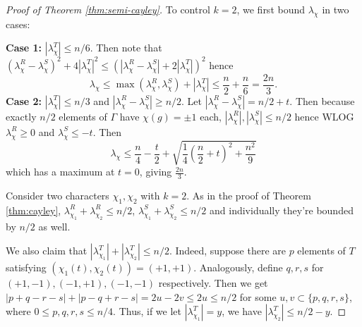 \documentclass[12pt]{article}
\begin{document}
\begin{proof}[Proof of Theorem \ref{thm:semi-cayley}]
    To control $k = 2$, we first bound $\lambda_\chi$ in two cases:
    \begin{outline}[enumerate]
        \1 \textbf{Case 1:} $|\lambda_\chi^T| \le n/6$. Then note that $(\lambda_\chi^R - \lambda_\chi^S)^2 + 4|\lambda_\chi^T|^2 \le (|\lambda_\chi^R - \lambda_\chi^S| + 2|\lambda_\chi^T|)^2$ hence
        \[\lambda_\chi \le \max(\lambda_\chi^R, \lambda_\chi^S) + |\lambda_\chi^T| \le \frac{n}{2} + \frac{n}{6} = \frac{2n}{3}.\] 
        \1 \textbf{Case 2:} $|\lambda_\chi^T| \le n/3$ and $|\lambda_\chi^R - \lambda_\chi^S| \ge n/2$. Let $|\lambda_\chi^R - \lambda_\chi^S| = n/2 + t$. Then because exactly $n/2$ elements of $\Gamma$ have $\chi(g) = \pm 1$ each, $|\lambda_\chi^R|, |\lambda_\chi^S| \le n/2$ hence WLOG $\lambda_\chi^R \ge 0$ and $\lambda_\chi^S \le -t$. Then 
        \[\lambda_\chi \le \frac{n}{4} - \frac{t}{2} + \sqrt{\frac14\left(\frac{n}{2} + t\right)^2 + \frac{n^2}{9}}\]
        which has a maximum at $t = 0$, giving $\frac{2n}{3}$. 
    \end{outline}

    Consider two characters $\chi_1, \chi_2$ with $k = 2$. As in the proof of Theorem \ref{thm:cayley}, $\lambda_{\chi_1}^R + \lambda_{\chi_2}^R \le n/2$, $\lambda_{\chi_1}^S + \lambda_{\chi_2}^S \le n/2$ and individually they're bounded by $n/2$ as well. 
    
    We also claim that $|\lambda_{\chi_1}^T| + |\lambda_{\chi_2}^T| \le n/2$. Indeed, suppose there are $p$ elements of $T$ satisfying $(\chi_1(t), \chi_2(t)) = (+1, +1)$. Analogously, define $q, r, s$ for $(+1, -1), (-1, +1), (-1, -1)$ respectively. Then we get $|p + q - r - s| + |p - q + r - s| = 2u - 2v \le 2u \le n/2$ for some $u, v \subset \{p, q, r, s\}$, where $0 \le p, q, r, s \le n/4$. Thus, if we let $|\lambda_{\chi_1}^T| = y$, we have $|\lambda_{\chi_2}^T| \le n/2 - y$. 


\end{proof}
\end{document}
